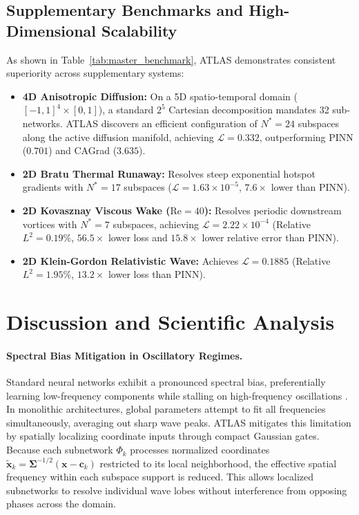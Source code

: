 \documentclass[runningheads]{llncs}
\begin{document}
\subsection{Supplementary Benchmarks and High-Dimensional Scalability}
As shown in Table~\ref{tab:master_benchmark}, ATLAS demonstrates consistent superiority across supplementary systems:
\begin{itemize}
    \item \textbf{4D Anisotropic Diffusion:} On a 5D spatio-temporal domain ($[-1, 1]^4 \times [0, 1]$), a standard $2^5$ Cartesian decomposition mandates 32 sub-networks. ATLAS discovers an efficient configuration of $N^*=24$ subspaces along the active diffusion manifold, achieving $\mathcal{L} = 0.332$, outperforming PINN ($0.701$) and CAGrad ($3.635$).
    \item \textbf{2D Bratu Thermal Runaway:} Resolves steep exponential hotspot gradients with $N^*=17$ subspaces ($\mathcal{L} = 1.63 \times 10^{-5}$, $\mathbf{7.6\times}$ lower than PINN).
    \item \textbf{2D Kovasznay Viscous Wake ($\mathrm{Re}=40$):} Resolves periodic downstream vortices with $N^*=7$ subspaces, achieving $\mathcal{L} = 2.22 \times 10^{-4}$ (Relative $L^2 = 0.19\%$, $\mathbf{56.5\times}$ lower loss and $\mathbf{15.8\times}$ lower relative error than PINN).
    \item \textbf{2D Klein-Gordon Relativistic Wave:} Achieves $\mathcal{L} = 0.1885$ (Relative $L^2 = 1.95\%$, $\mathbf{13.2\times}$ lower loss than PINN).
\end{itemize}

\section{Discussion and Scientific Analysis}
\label{sec:discussion}
\paragraph{Spectral Bias Mitigation in Oscillatory Regimes.} Standard neural networks exhibit a pronounced spectral bias, preferentially learning low-frequency components while stalling on high-frequency oscillations \cite{wang2021understanding}. In monolithic architectures, global parameters attempt to fit all frequencies simultaneously, averaging out sharp wave peaks. ATLAS mitigates this limitation by spatially localizing coordinate inputs through compact Gaussian gates. Because each subnetwork $\Phi_k$ processes normalized coordinates $\tilde{\mathbf{x}}_k = \boldsymbol{\Sigma}^{-1/2}(\mathbf{x} - \mathbf{c}_k)$ restricted to its local neighborhood, the effective spatial frequency within each subspace support is reduced. This allows localized subnetworks to resolve individual wave lobes without interference from opposing phases across the domain.
\end{document}
